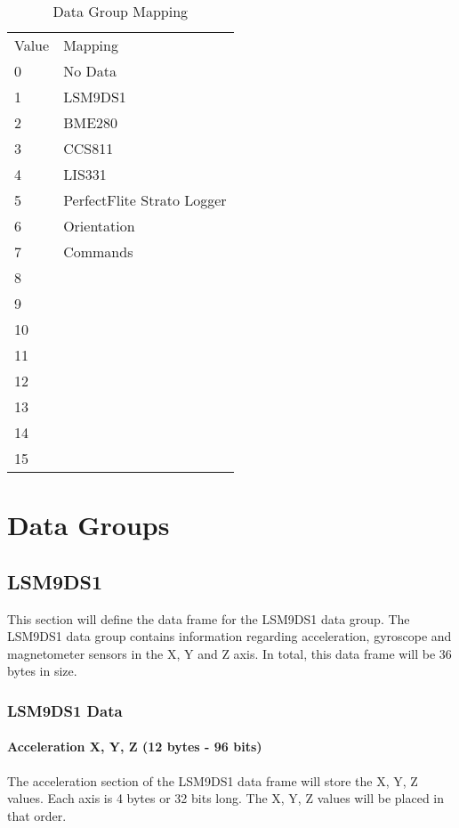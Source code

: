 \documentclass{article}
\begin{document}
  \begin{table}[h]
  \centering
  \caption{Data Group Mapping}
  \begin{tabular}{ll}
  Value & Mapping \\
  0     & No Data \\
  1     & LSM9DS1     \\
  2     & BME280        \\
  3     & CCS811        \\
  4     & LIS331      \\
  5     & PerfectFlite Strato Logger       \\
  6     & Orientation   \\
  7     &  Commands  \\
  8     &         \\
  9     &         \\
  10    &         \\
  11    &         \\
  12    &         \\
  13    &         \\
  14    &         \\
  15    &        
  \end{tabular}
  \end{table}
  
  \pagebreak
  
  \section{Data Groups}
  \subsection{LSM9DS1}
  This section will define the data frame for the LSM9DS1 data group. The LSM9DS1 data group contains information regarding acceleration, gyroscope and magnetometer sensors in the X, Y and Z axis. In total, this data frame will be 36 bytes in size. 
  \subsubsection{LSM9DS1 Data}
  \paragraph{Acceleration X, Y, Z (12 bytes - 96 bits)}
  The acceleration section of the LSM9DS1 data frame will store the X, Y, Z values. Each axis is 4 bytes or 32 bits long. The X, Y, Z values will be placed in that order.
\end{document}

